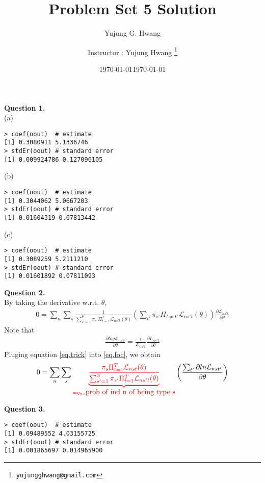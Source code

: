 \documentclass[paper=a4, fontsize=13pt]{extarticle} %
\author{Yujung G. Hwang} %
\date{\today} %
\numberwithin{equation}{section} %
\numberwithin{figure}{section} %
\numberwithin{table}{section} %
\begin{document}
\title{	
\normalfont \normalsize 
\huge Problem Set 5 Solution
}
\author{
Instructor : Yujung Hwang \thanks{\texttt{yujungghwang@gmail.com}}} %
\date{\today} %
\maketitle %

\upshape \mdseries 
\normalsize

\textbf{Question 1.} \\
(a) \\
\begin{lstlisting}
> coef(oout)  # estimate
[1] 0.3080911 5.1336746
> stdEr(oout) # standard error
[1] 0.009924786 0.127096105
\end{lstlisting}

(b) \\
\begin{lstlisting}
> coef(oout)  # estimate
[1] 0.3044062 5.0667203
> stdEr(oout) # standard error
[1] 0.01604319 0.07813442
\end{lstlisting}

(c) \\
\begin{lstlisting}
> coef(oout)  # estimate
[1] 0.3089259 5.2111210
> stdEr(oout) # standard error
[1] 0.01601892 0.07811093
\end{lstlisting}

\vspace{0.2in}
\textbf{Question 2.} \\
By taking the derivative w.r.t. $\theta$,
\begin{eqnarray}
0 = \sum_n \sum_s \frac{1}{ \sum_{s'=1}^{S} \pi_{s'} \Pi_{t=1}^{T} \mathcal{L}_{ns't} (\theta)  } ( \sum_{t'} \pi_{s'} \Pi_{t \neq t'}  \mathcal{L}_{ns't}(\theta) ) \frac{\partial \mathcal{L}_{ns't}}{\partial \theta} \label{eq.foc}
\end{eqnarray}
Note that 
\begin{gather}
\frac{\partial log \mathcal{L}_{ns't}}{\partial \theta} = \frac{1}{\mathcal{L}_{ns't}} \frac{\partial L_{ns't}}{\partial \theta} \label{eq.trick}
\end{gather}
Pluging equation \ref{eq.trick} into \ref{eq.foc}, we obtain
\begin{gather}
0=\sum_n \sum_s \color{red} \underbrace{ \frac{\pi_s \Pi_{t=1}^{T} \mathcal{L}_{nst} (\theta)}{ \sum_{s'=1}^{S} \pi_{s'} \Pi_{t=1}^{T} \mathcal{L}_{ns't} (\theta)  } }_{ = q_{ns} \mbox{prob of ind n of being type s} } \color{black} \left( \frac{\sum_{t'} \partial ln \mathcal{L}_{nst'} }{\partial \theta} \right) \label{eq.foc}
\end{gather} 

\vspace{0.2in}
\textbf{Question 3.}\\
\begin{lstlisting}
> coef(oout)  # estimate
[1] 0.09489552 4.03155725
> stdEr(oout) # standard error
[1] 0.001865697 0.014965900
\end{lstlisting}
\end{document}
